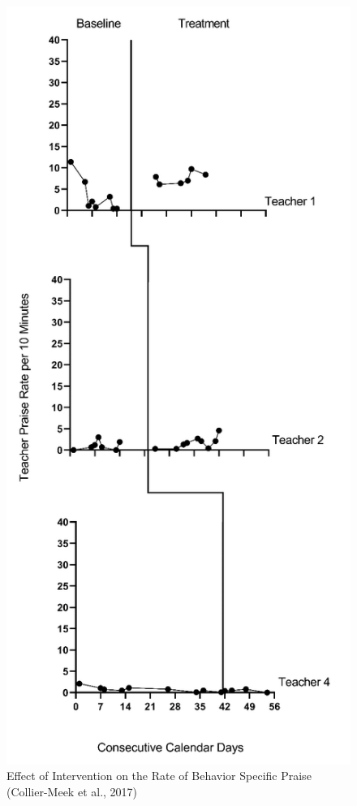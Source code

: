 \documentclass[
]{book}
\begin{document}
\begin{figure}
\includegraphics[width=0.6\linewidth]{images/CollierMeek2017} \caption{Effect of Intervention on the Rate of Behavior Specific Praise (Collier-Meek et al., 2017)}\label{fig:CollierMeek-raw-2017}
\end{figure}
\end{document}
